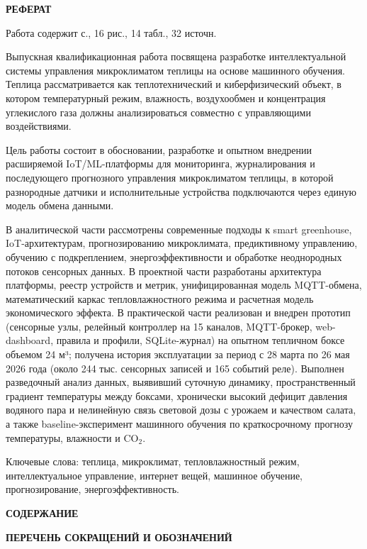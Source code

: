 \documentclass[a4paper,14pt]{extarticle}
\newcommand{\VkrStructuralSection}[1]{%
  \FloatBarrier
  \clearpage
  \phantomsection
  \addcontentsline{toc}{section}{#1}%
  \begin{center}\bfseries #1\end{center}%
  \par\nopagebreak\vspace{12pt}%
}
\newcommand{\VkrStructuralSectionNoToc}[1]{%
  \begin{center}\bfseries #1\end{center}%
  \par\nopagebreak\vspace{12pt}%
}
\begin{document}
\hypertarget{ux440ux435ux444ux435ux440ux430ux442}{%
\VkrStructuralSectionNoToc{РЕФЕРАТ}\label{ux440ux435ux444ux435ux440ux430ux442}}

Работа содержит \pageref{LastPage} с., 16 рис., 14 табл., 32 источн.

Выпускная квалификационная работа посвящена разработке интеллектуальной
системы управления микроклиматом теплицы на основе машинного обучения.
Теплица рассматривается как теплотехнический и киберфизический объект, в
котором температурный режим, влажность, воздухообмен и концентрация
углекислого газа должны анализироваться совместно с управляющими
воздействиями.

Цель работы состоит в обосновании, разработке и опытном внедрении
расширяемой IoT/ML-платформы для мониторинга, журналирования и
последующего прогнозного управления микроклиматом теплицы, в которой
разнородные датчики и исполнительные устройства подключаются через
единую модель обмена данными.

В аналитической части рассмотрены современные подходы к smart
greenhouse, IoT-архитектурам, прогнозированию микроклимата,
предиктивному управлению, обучению с подкреплением, энергоэффективности
и обработке неоднородных потоков сенсорных данных. В проектной части
разработаны архитектура платформы, реестр устройств и метрик,
унифицированная модель MQTT-обмена, математический каркас
тепловлажностного режима и расчетная модель экономического эффекта. В
практической части реализован и внедрен прототип (сенсорные узлы,
релейный контроллер на 15 каналов, MQTT-брокер, web-dashboard, правила и
профили, SQLite-журнал) на опытном тепличном боксе объемом 24 м³;
получена история эксплуатации за период с 28 марта по 26 мая 2026 года
(около 244 тыс. сенсорных записей и 165 событий реле). Выполнен
разведочный анализ данных, выявивший суточную динамику, пространственный
градиент температуры между боксами, хронически высокий дефицит давления
водяного пара и нелинейную связь световой дозы с урожаем и качеством
салата, а также baseline-эксперимент машинного обучения по
краткосрочному прогнозу температуры, влажности и CO\(_2\).

Ключевые слова: теплица, микроклимат, тепловлажностный режим,
интеллектуальное управление, интернет вещей, машинное обучение,
прогнозирование, энергоэффективность.

\clearpage

\VkrStructuralSectionNoToc{СОДЕРЖАНИЕ}
\makeatletter{}\makeatother
\clearpage

\hypertarget{ux441ux43fux438ux441ux43eux43a-ux441ux43eux43aux440ux430ux449ux435ux43dux438ux439-ux438-ux43eux431ux43eux437ux43dux430ux447ux435ux43dux438ux439}{%
\VkrStructuralSection{ПЕРЕЧЕНЬ СОКРАЩЕНИЙ И ОБОЗНАЧЕНИЙ}\label{ux441ux43fux438ux441ux43eux43a-ux441ux43eux43aux440ux430ux449ux435ux43dux438ux439-ux438-ux43eux431ux43eux437ux43dux430ux447ux435ux43dux438ux439}}
\end{document}
